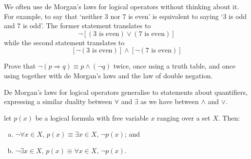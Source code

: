 \begin{example}
We often use de Morgan's laws for logical operators without thinking about it. For example, to say that `neither $3$ nor $7$ is even' is equivalent to saying `$3$ is odd and $7$ is odd'. The former statement translates to
\[ \neg [(3 \text{ is even}) \vee (7 \text{ is even})]\]
while the second statement translates to
\[ [\neg (3 \text{ is even})] \wedge [\neg (7 \text{ is even})]\]
\end{example}

\begin{exercise}
\label{exNegationOfImplication}
Prove that $\neg (p \Rightarrow q) \equiv p \wedge (\neg q)$ twice, once using a truth table, and once using  together with de Morgan's laws and the law of double negation.
\end{exercise}

De Morgan's laws for logical operators generalise to statements about quantifiers, expressing a similar duality between $\forall$ and $\exists$ as we have between $\wedge$ and $\vee$.

\begin{theorem}
\label{thmDeMorganQuantifiers}
let $p(x)$ be a logical formula with free variable $x$ ranging over a set $X$. Then:
\begin{enumerate}[(a)]
\item $\neg \forall x \in X,\, p(x) \equiv \exists x \in X,\, \neg p(x)$; and
\item $\neg \exists x \in X,\, p(x) \equiv \forall x \in X,\, \neg p(x)$.
\end{enumerate}
\end{theorem}

